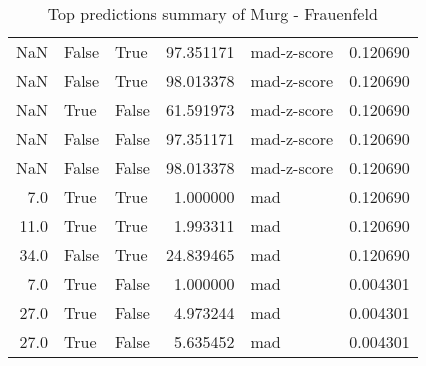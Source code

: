 \begin{table}[htp]
\begin{tabular}{rllrlr}
         NaN &          False &        True &  97.351171 & mad-z-score &  0.120690 \\
         NaN &          False &        True &  98.013378 & mad-z-score &  0.120690 \\
         NaN &           True &       False &  61.591973 & mad-z-score &  0.120690 \\
         NaN &          False &       False &  97.351171 & mad-z-score &  0.120690 \\
         NaN &          False &       False &  98.013378 & mad-z-score &  0.120690 \\
         7.0 &           True &        True &   1.000000 &         mad &  0.120690 \\
        11.0 &           True &        True &   1.993311 &         mad &  0.120690 \\
        34.0 &          False &        True &  24.839465 &         mad &  0.120690 \\
         7.0 &           True &       False &   1.000000 &         mad &  0.004301 \\
        27.0 &           True &       False &   4.973244 &         mad &  0.004301 \\
        27.0 &           True &       False &   5.635452 &         mad &  0.004301 \\
\bottomrule
\end{tabular}
\caption{Top predictions summary of Murg - Frauenfeld}
\label{table:2386-ch-top-predictions-summary}
\end{table}
